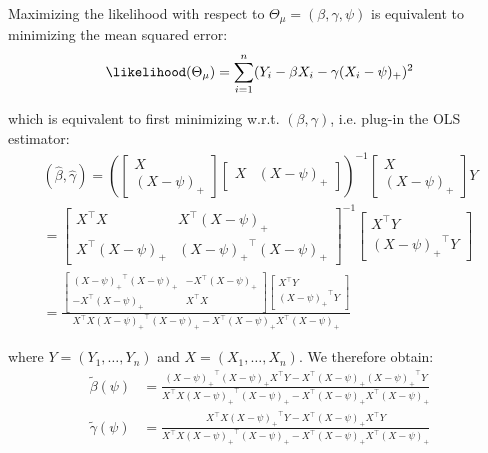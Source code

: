 \documentclass[12pt]{article}
\newcommand\trans[1]{{#1}^\intercal}%
\begin{document}
\noindent Maximizing the likelihood with respect to \(\Theta_\mu =
(\beta,\gamma,\psi)\) is equivalent to minimizing the mean squared
error:
\begin{align*}
\likelihood(\Theta_\mu) = \sum_{i=1}^n (Y_i - \beta X_i - \gamma (X_i - \psi)_+)^2
\end{align*}

\noindent which is equivalent to first minimizing
w.r.t. \((\beta,\gamma)\), i.e. plug-in the OLS estimator:
\begin{align*}
(\widehat{\beta},\widehat{\gamma}) = \left(\begin{bmatrix} X \\ (X - \psi)_+ \end{bmatrix} \begin{bmatrix} X & (X - \psi)_+ \end{bmatrix} \right)^{-1} \begin{bmatrix} X \\ (X - \psi)_+ \end{bmatrix} Y \\
= \begin{bmatrix} \trans{X}X & \trans{X}(X - \psi)_+ \\  \trans{X}(X - \psi)_+ & \trans{(X - \psi)_+} (X - \psi)_+ \end{bmatrix}^{-1} \begin{bmatrix} \trans{X} Y \\ \trans{(X - \psi)_+} Y \end{bmatrix}  \\
= \frac{\begin{bmatrix} \trans{(X - \psi)_+} (X - \psi)_+ & -\trans{X}(X - \psi)_+ \\  -\trans{X}(X - \psi)_+ & \trans{X}X \end{bmatrix} \begin{bmatrix} \trans{X} Y \\ \trans{(X - \psi)_+} Y \end{bmatrix} }{\trans{X}X\trans{(X - \psi)_+} (X - \psi)_+ -\trans{X}(X - \psi)_+\trans{X}(X - \psi)_+} 
\end{align*}

where \(Y = (Y_1,\ldots,Y_n)\) and \(X=(X_1,\ldots,X_n)\). We therefore obtain:
\begin{align*}
\tilde{\beta}(\psi) &= \frac{ \trans{(X - \psi)_+} (X - \psi)_+ \trans{X} Y -\trans{X}(X - \psi)_+ \trans{(X - \psi)_+} Y }{\trans{X}X\trans{(X - \psi)_+} (X - \psi)_+ -\trans{X}(X - \psi)_+ \trans{X}(X - \psi)_+}  \\
\tilde{\gamma}(\psi) &= \frac{ \trans{X} X \trans{(X - \psi)_+} Y -\trans{X}(X - \psi)_+ \trans{X} Y }{\trans{X}X\trans{(X - \psi)_+} (X - \psi)_+ -\trans{X}(X - \psi)_+ \trans{X}(X - \psi)_+}  
\end{align*}
\end{document}
